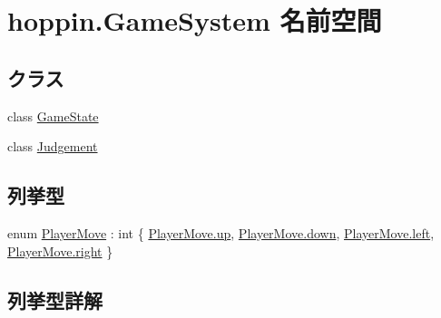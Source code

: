 \hypertarget{namespacehoppin_1_1_game_system}{}\section{hoppin.\+Game\+System 名前空間}
\label{namespacehoppin_1_1_game_system}
\subsection*{クラス}
\begin{DoxyCompactItemize}
\item 
class \hyperlink{classhoppin_1_1_game_system_1_1_game_state}{Game\+State}
\item 
class \hyperlink{classhoppin_1_1_game_system_1_1_judgement}{Judgement}
\end{DoxyCompactItemize}
\subsection*{列挙型}
\begin{DoxyCompactItemize}
\item 
enum \hyperlink{namespacehoppin_1_1_game_system_a09ca9399921bb6094069df368b7c3f0f}{Player\+Move} \+: int \{ \hyperlink{namespacehoppin_1_1_game_system_a09ca9399921bb6094069df368b7c3f0fa46c48bec0d282018b9d167eef7711b2c}{Player\+Move.\+up}, 
\hyperlink{namespacehoppin_1_1_game_system_a09ca9399921bb6094069df368b7c3f0fa74e8333ad11685ff3bdae589c8f6e34d}{Player\+Move.\+down}, 
\hyperlink{namespacehoppin_1_1_game_system_a09ca9399921bb6094069df368b7c3f0fa811882fecd5c7618d7099ebbd39ea254}{Player\+Move.\+left}, 
\hyperlink{namespacehoppin_1_1_game_system_a09ca9399921bb6094069df368b7c3f0fa7c4f29407893c334a6cb7a87bf045c0d}{Player\+Move.\+right}
 \}
\end{DoxyCompactItemize}


\subsection{列挙型詳解}
